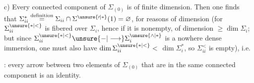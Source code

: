 c) \deleted{\unsure{---}} Every connected component of $\Sigma_{(0)}$ is of
finite dimension.
Then one finds that $\Sigma_{ii}^{*}\overset{\mathrm{definition}}{=}\Sigma_{ii}\cap\Sigma^{\unsure{\prime|*}}(1)=\varnothing$,
for reasons of dimension (for $\Sigma_{ii}^{\unsure{*|<}}$ is
fibered over  $\Sigma_i$, hence if it is nonempty, of
dimension $\geq\dim\Sigma_i$; but since $\Sigma_{ii}^{\unsure{*|<}}\unsure{-|\longrightarrow}\Sigma_i^{\unsure{\wedge|*}}$ is
a nowhere dense immersion, one must also have $\dim\Sigma_{ii}^{\unsure{*|<}}<$
$\dim\Sigma_i^{*}$, so $\Sigma_{ii}^{<}$ is empty), i.e.
\par\noindent
{}: every arrow  between two
 elements of $\Sigma_{(0)}$ that are in the
same connected component  is an identity.
